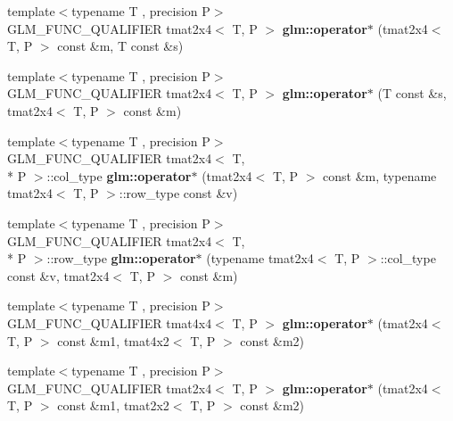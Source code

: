 \begin{DoxyCompactItemize}
\item 
\hypertarget{namespaceglm_a75b1d4aef24642cfdfa64e5ab6750ecb}{{\footnotesize template$<$typename T , precision P$>$ }\\G\-L\-M\-\_\-\-F\-U\-N\-C\-\_\-\-Q\-U\-A\-L\-I\-F\-I\-E\-R tmat2x4$<$ T, P $>$ {\bfseries glm\-::operator$\ast$} (tmat2x4$<$ T, P $>$ const \&m, T const \&s)}\label{namespaceglm_a75b1d4aef24642cfdfa64e5ab6750ecb}

\item 
\hypertarget{namespaceglm_a7606b6ba88f55e504bf9d560a88e0d62}{{\footnotesize template$<$typename T , precision P$>$ }\\G\-L\-M\-\_\-\-F\-U\-N\-C\-\_\-\-Q\-U\-A\-L\-I\-F\-I\-E\-R tmat2x4$<$ T, P $>$ {\bfseries glm\-::operator$\ast$} (T const \&s, tmat2x4$<$ T, P $>$ const \&m)}\label{namespaceglm_a7606b6ba88f55e504bf9d560a88e0d62}

\item 
\hypertarget{namespaceglm_a3772f89585867565204253e3565e37cc}{{\footnotesize template$<$typename T , precision P$>$ }\\G\-L\-M\-\_\-\-F\-U\-N\-C\-\_\-\-Q\-U\-A\-L\-I\-F\-I\-E\-R tmat2x4$<$ T, \\*
P $>$\-::col\-\_\-type {\bfseries glm\-::operator$\ast$} (tmat2x4$<$ T, P $>$ const \&m, typename tmat2x4$<$ T, P $>$\-::row\-\_\-type const \&v)}\label{namespaceglm_a3772f89585867565204253e3565e37cc}

\item 
\hypertarget{namespaceglm_ad617e550b85d998ff5a8e28b251f1576}{{\footnotesize template$<$typename T , precision P$>$ }\\G\-L\-M\-\_\-\-F\-U\-N\-C\-\_\-\-Q\-U\-A\-L\-I\-F\-I\-E\-R tmat2x4$<$ T, \\*
P $>$\-::row\-\_\-type {\bfseries glm\-::operator$\ast$} (typename tmat2x4$<$ T, P $>$\-::col\-\_\-type const \&v, tmat2x4$<$ T, P $>$ const \&m)}\label{namespaceglm_ad617e550b85d998ff5a8e28b251f1576}

\item 
\hypertarget{namespaceglm_a4e69ab15c960142f85239bf176d0f033}{{\footnotesize template$<$typename T , precision P$>$ }\\G\-L\-M\-\_\-\-F\-U\-N\-C\-\_\-\-Q\-U\-A\-L\-I\-F\-I\-E\-R tmat4x4$<$ T, P $>$ {\bfseries glm\-::operator$\ast$} (tmat2x4$<$ T, P $>$ const \&m1, tmat4x2$<$ T, P $>$ const \&m2)}\label{namespaceglm_a4e69ab15c960142f85239bf176d0f033}

\item 
\hypertarget{namespaceglm_a6e95f7bb50c470a281e61d84895675d4}{{\footnotesize template$<$typename T , precision P$>$ }\\G\-L\-M\-\_\-\-F\-U\-N\-C\-\_\-\-Q\-U\-A\-L\-I\-F\-I\-E\-R tmat2x4$<$ T, P $>$ {\bfseries glm\-::operator$\ast$} (tmat2x4$<$ T, P $>$ const \&m1, tmat2x2$<$ T, P $>$ const \&m2)}\label{namespaceglm_a6e95f7bb50c470a281e61d84895675d4}


\end{DoxyCompactItemize}
